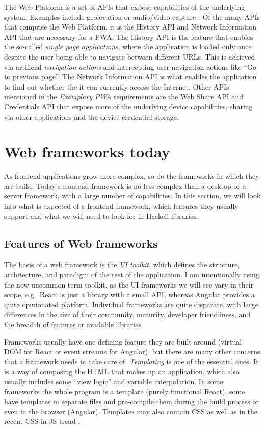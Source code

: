 \documentclass[english,zadani,odsaz]{fitthesis}
\begin{document}
The Web Platform is a set of APIs that expose capabilities of the underlying
system. Examples include geolocation or audio/video capture
\cite{what_web_can_do}. Of the many APIs that comprise the Web Platform, it is the
History API and Network Information API that are necessary for a PWA. The
History API is the feature that enables the so-called \emph{single page applications},
where the application is loaded only once despite the user being able to
navigate between different URLs. This is achieved via artificial \emph{navigation
actions} and intercepting user navigation actions like ``Go to previous page''. The
Network Information API is what enables the application to find out whether the
it can currently access the Internet. Other APIs mentioned in the \emph{Exemplary PWA}
requirements are the Web Share API and Credentials API that expose more of the
underlying device capabilities, sharing via other applications and the device
credential storage.

\chapter{Web frameworks today}
\label{sec:org3227216}
As frontend applications grow more complex, so do the frameworks in which they
are build. Today's frontend framework is no less complex than a desktop or a
server framework, with a large number of capabilities. In this section, we will
look into what is expected of a frontend framework, which features they usually
support and what we will need to look for in Haskell libraries.

\section{Features of Web frameworks}
\label{sec:org7195e22}
The basis of a web framework is the \emph{UI toolkit}, which defines the structure,
architecture, and paradigm of the rest of the application. I am intentionally
using the now-uncommon term toolkit, as the UI frameworks we will see vary in
their scope, e.g.~React is just a library with a small API, whereas Angular
provides a quite opinionated platform. Individual frameworks are quite
disparate, with large differences in the size of their community, maturity,
developer friendliness, and the breadth of features or available libraries.

Frameworks usually have one defining feature they are built around (virtual DOM
for React or event streams for Angular), but there are many other concerns that
a framework needs to take care of. \emph{Templating} is one of the essential ones. It
is a way of composing the HTML that makes up an application, which also usually
includes some ``view logic'' and variable interpolation. In some frameworks the
whole program is a template (purely functional React), some have templates in
separate files and pre-compile them during the build process or even in the
browser (Angular). Templates may also contain CSS as well as in the recent
CSS-in-JS trend \cite{cssInJs}.
\end{document}
